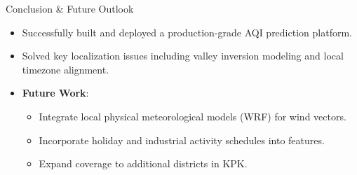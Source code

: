 \documentclass[aspectratio=169]{beamer}
\begin{document}
\begin{frame}{Conclusion \& Future Outlook}
  \begin{itemize}
    \item Successfully built and deployed a production-grade AQI prediction platform.
    \item Solved key localization issues including valley inversion modeling and local timezone alignment.
    \item \textbf{Future Work}:
      \begin{itemize}
        \item Integrate local physical meteorological models (WRF) for wind vectors.
        \item Incorporate holiday and industrial activity schedules into features.
        \item Expand coverage to additional districts in KPK.
      \end{itemize}
  \end{itemize}
\end{frame}
\end{document}
